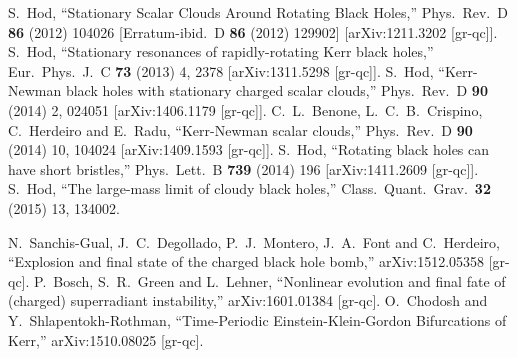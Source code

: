 \documentclass{article}
\numberwithin{equation}{section}
\begin{document}
\begin{small}
\begin{thebibliography}{99}
  S.~Hod,
  ``Stationary Scalar Clouds Around Rotating Black Holes,''
  Phys.\ Rev.\ D {\bf 86} (2012) 104026
   [Erratum-ibid.\ D {\bf 86} (2012) 129902]
  [arXiv:1211.3202 [gr-qc]].
  S.~Hod,
  ``Stationary resonances of rapidly-rotating Kerr black holes,''
  Eur.\ Phys.\ J.\ C {\bf 73} (2013) 4,  2378
  [arXiv:1311.5298 [gr-qc]].
  S.~Hod,
  ``Kerr-Newman black holes with stationary charged scalar clouds,''
  Phys.\ Rev.\ D {\bf 90} (2014) 2,  024051
  [arXiv:1406.1179 [gr-qc]].
  C.~L.~Benone, L.~C.~B.~Crispino, C.~Herdeiro and E.~Radu,
  ``Kerr-Newman scalar clouds,''
  Phys.\ Rev.\ D {\bf 90} (2014) 10,  104024
  [arXiv:1409.1593 [gr-qc]].
  S.~Hod,
  ``Rotating black holes can have short bristles,''
  Phys.\ Lett.\ B {\bf 739} (2014) 196
  [arXiv:1411.2609 [gr-qc]].
  S.~Hod,
  ``The large-mass limit of cloudy black holes,''
  Class.\ Quant.\ Grav.\  {\bf 32} (2015) 13,  134002.

  
  N.~Sanchis-Gual, J.~C.~Degollado, P.~J.~Montero, J.~A.~Font and C.~Herdeiro,
  ``Explosion and final state of the charged black hole bomb,''
  arXiv:1512.05358 [gr-qc].
  P.~Bosch, S.~R.~Green and L.~Lehner,
  ``Nonlinear evolution and final fate of (charged) superradiant instability,''
  arXiv:1601.01384 [gr-qc].
  O.~Chodosh and Y.~Shlapentokh-Rothman,
  ``Time-Periodic Einstein-Klein-Gordon Bifurcations of Kerr,''
  arXiv:1510.08025 [gr-qc].


\end{thebibliography}
\end{small}
\end{document}

